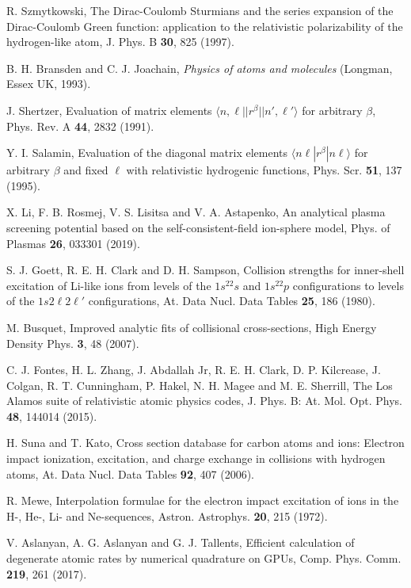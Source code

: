 \documentclass[a4paper,10pt]{article}
\begin{document}
\begin{thebibliography}{99}
R. Szmytkowski, The Dirac-Coulomb Sturmians and the series expansion of the Dirac-Coulomb Green function: application to the relativistic polarizability of the hydrogen-like atom, J. Phys. B {\bf 30}, 825 (1997).

B. H. Bransden and C. J. Joachain, {\it Physics of atoms and molecules} (Longman, Essex UK, 1993).

J. Shertzer, Evaluation of matrix elements $\langle n,\ell||r^{\beta}||n',\ell'\rangle$ for arbitrary $\beta$, Phys. Rev. A {\bf 44}, 2832 (1991).

Y. I. Salamin, Evaluation of the diagonal matrix elements $\langle n\ell|r^{\beta}|n\ell\rangle$ for arbitrary $\beta$ and fixed $\ell$ with relativistic hydrogenic functions, Phys. Scr. {\bf 51}, 137 (1995).

X. Li, F. B. Rosmej, V. S. Lisitsa and V. A. Astapenko, An analytical plasma screening potential based on the self-consistent-field ion-sphere model, Phys. of Plasmas {\bf 26}, 033301 (2019).

S. J. Goett, R. E. H. Clark and D. H. Sampson, Collision strengths for inner-shell excitation of Li-like ions from levels of the $1s^22s$ and $1s^22p$ configurations to levels of the $1s2\ell2\ell'$ configurations, At. Data Nucl. Data Tables {\bf 25}, 186 (1980).

M. Busquet, Improved analytic fits of collisional cross-sections, High Energy Density Phys. {\bf 3}, 48 (2007).

C. J. Fontes, H. L. Zhang, J. Abdallah Jr, R. E. H. Clark, D. P. Kilcrease, J. Colgan, R. T. Cunningham, P. Hakel, N. H. Magee and M. E. Sherrill, The Los Alamos suite of relativistic atomic physics codes, J. Phys. B: At. Mol. Opt. Phys. {\bf 48}, 144014 (2015).

H. Suna and T. Kato, Cross section database for carbon atoms and ions: Electron impact ionization, excitation, and charge exchange in collisions with hydrogen atoms, At. Data Nucl. Data Tables {\bf 92}, 407 (2006).

R. Mewe, Interpolation formulae for the electron impact excitation of ions in the H-, He-, Li- and Ne-sequences, Astron. Astrophys. {\bf 20}, 215 (1972).

V. Aslanyan, A. G. Aslanyan and G. J. Tallents, Efficient calculation of degenerate atomic rates by numerical quadrature on GPUs, Comp. Phys. Comm. {\bf 219}, 261 (2017).


\end{thebibliography}
\end{document}
